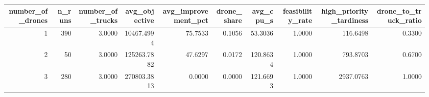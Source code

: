 \begin{tabular}{rrrrrrrrrr}
\toprule
number_of_drones & n_runs & number_of_trucks & avg_objective & avg_improvement_pct & drone_share & avg_cpu_s & feasibility_rate & high_priority_tardiness & drone_to_truck_ratio \\
\midrule
1 & 390 & 3.0000 & 10467.4994 & 75.7533 & 0.1056 & 53.3036 & 1.0000 & 116.6498 & 0.3300 \\
2 & 50 & 3.0000 & 125263.7882 & 47.6297 & 0.0172 & 120.8634 & 1.0000 & 793.8703 & 0.6700 \\
3 & 280 & 3.0000 & 270803.3813 & 0.0000 & 0.0000 & 121.6693 & 1.0000 & 2937.0763 & 1.0000 \\
\bottomrule
\end{tabular}
